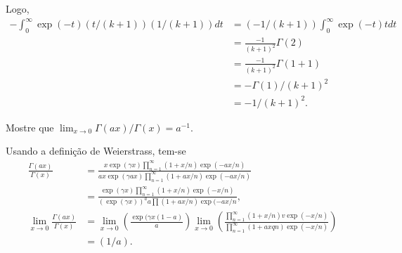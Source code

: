 \documentclass[a4paper,12pt, leqno, answers]{exam}
\begin{document}
\begin{questions}
\begin{parts}
\begin{solution}
            Logo,
            \begin{align*}
                - \int_0^\infty \exp \left( -t \right) \left( t / \left( k + 1 \right) \right) \left( 1 / \left( k + 1 \right) \right) dt &= \left( -1 / \left( k + 1 \right) \right) \int_0^\infty \exp \left( -t \right) t dt \\
                &= \frac{-1}{\left( k + 1 \right)^2} \Gamma \left( 2 \right) \\
                &= \frac{-1}{\left( k + 1 \right)^2} \Gamma \left( 1 + 1 \right) \\
                &= - \Gamma \left( 1 \right) / \left( k + 1 \right)^2 \\
                &= - 1 / \left( k + 1 \right)^2.
            \end{align*}
        \end{solution}
    \end{parts}

    \question Mostre que $\lim_{x \to 0} \Gamma(a x) / \Gamma(x) = a^{-1}$.
    \begin{solution}
        Usando a defini\c{c}\~{a}o de Weierstrass, tem-se
        \begin{align*}
            \frac{\Gamma(a x)}{\Gamma(x)} &= \frac{x \exp(\gamma x) \prod_{n = 1}^\infty \left( 1 + x / n \right) \exp(-a x / n)}{a x \exp(\gamma a x) \prod_{n = 1}^\infty \left( 1 + a x / n \right) \exp(-a x / n)} \\
            &= \frac{\exp(\gamma x) \prod_{n = 1}^\infty \left( 1 + x / n \right) \exp(-x / n)}{\left( \exp(\gamma x) \right)^a a \prod \left( 1 + a x / n \right) \exp(-a x / n}, \\
            \lim_{x \to 0} \frac{\Gamma(a x)}{\Gamma(x)} &= \lim_{x \to 0} \left( \frac{\exp(\gamma x (1 - a)}{a} \right) \lim_{x \to 0} \left( \frac{\prod_{n = 1}^\infty (1 + x / n)v \exp(- x / n)}{\prod_{n = 1}^\infty (1 + a x q n) \exp(-x / n)} \right) \\
            &= \left( 1 / a \right).
        \end{align*} \\
    \end{solution}


\end{questions}
\end{document}
